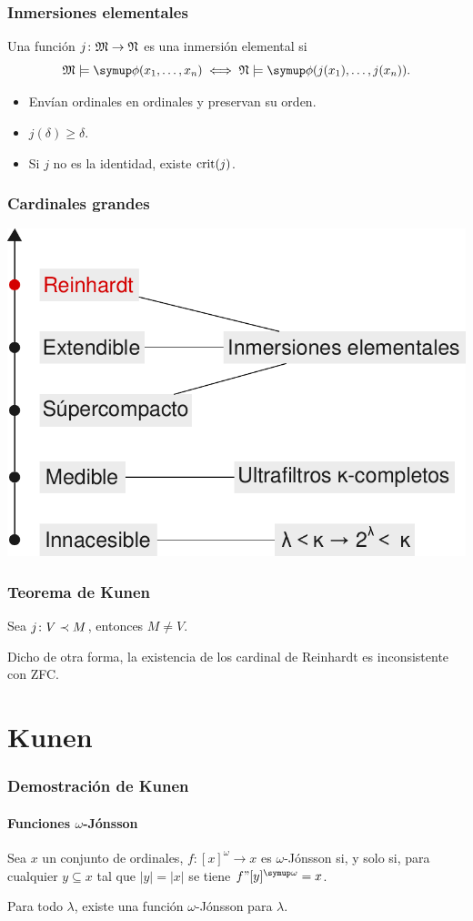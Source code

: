 \documentclass{beamer}
\begin{document}
\begin{frame}
    \frametitle{Inmersiones elementales}

    Una función $j\colon\mathfrak { M }\to\mathfrak { N }$ es una inmersión elemental si
    \[
        \model{M}\models\phi(x_1,\dots,x_n) \iff \model{N}\models\phi(j(x_1),\dots,j(x_n)).
    \]

    \begin{itemize}
        \pause
        \item Envían ordinales en ordinales y preservan su orden.
        \pause
        \item $j(\delta)\geq\delta$.
        \pause
        \item Si $j$ no es la identidad, existe $\operatorname{crit} (j)$.
    \end{itemize}
\end{frame}

\begin{frame}
    \frametitle{Cardinales grandes}
        \centering
        \includegraphics[keepaspectratio, width=.75\linewidth]{resources/large-cardinal.pdf}
\end{frame}

\begin{frame}
    \frametitle{Teorema de Kunen}

    Sea $j\colon V\prec M$, entonces $M\neq V$.

    \pause
    \bigskip
    Dicho de otra forma, la existencia de los cardinal de Reinhardt es inconsistente con ZFC.
\end{frame}


\section{Kunen}

\begin{frame}
    \frametitle{Demostración de Kunen}
    \framesubtitle{Funciones $\omega$-Jónsson}

    \pause
    \begin{defi}
        Sea $x$ un conjunto de ordinales,
        $f\colon [x]^\omega\to x$ es $\omega$-Jónsson
        si, y solo si, para cualquier $y\subseteq x$ tal que $|y|=|x|$
        se tiene $f"[y]^\omega = x$.
    \end{defi}

    \pause
    \begin{teo}
        Para todo $\lambda$, existe una función
        $\omega$-Jónsson para $\lambda$.
    \end{teo}
\end{frame}
\end{document}
